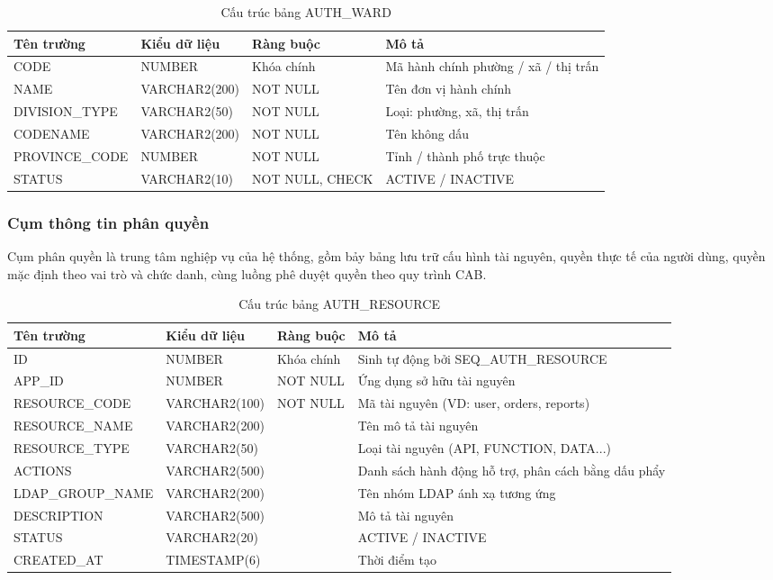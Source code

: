 \documentclass[../DoAn.tex]{subfiles}
\begin{document}
\begin{table}[H]
\centering
\caption{Cấu trúc bảng AUTH\_WARD}
\label{tab:auth-ward}
\footnotesize
\begin{tabular}{|p{3.0cm}|p{2.3cm}|p{2.7cm}|p{4.5cm}|}
\hline
\textbf{Tên trường} & \textbf{Kiểu dữ liệu} & \textbf{Ràng buộc} & \textbf{Mô tả} \\ \hline
CODE & NUMBER & Khóa chính & Mã hành chính phường / xã / thị trấn \\ \hline
NAME & VARCHAR2(200) & NOT NULL & Tên đơn vị hành chính \\ \hline
DIVISION\_TYPE & VARCHAR2(50) & NOT NULL & Loại: phường, xã, thị trấn \\ \hline
CODENAME & VARCHAR2(200) & NOT NULL & Tên không dấu \\ \hline
PROVINCE\_CODE & NUMBER & NOT NULL & Tỉnh / thành phố trực thuộc \\ \hline
STATUS & VARCHAR2(10) & NOT NULL, CHECK & ACTIVE / INACTIVE \\ \hline
\end{tabular}
\end{table}

\subsubsection{Cụm thông tin phân quyền}

Cụm phân quyền là trung tâm nghiệp vụ của hệ thống, gồm bảy bảng lưu trữ cấu hình tài nguyên, quyền thực tế của người dùng, quyền mặc định theo vai trò và chức danh, cùng luồng phê duyệt quyền theo quy trình CAB.

\begin{table}[H]
\centering
\caption{Cấu trúc bảng AUTH\_RESOURCE}
\label{tab:auth-resource}
\footnotesize
\begin{tabular}{|p{3.0cm}|p{2.3cm}|p{2.7cm}|p{4.5cm}|}
\hline
\textbf{Tên trường} & \textbf{Kiểu dữ liệu} & \textbf{Ràng buộc} & \textbf{Mô tả} \\ \hline
ID & NUMBER & Khóa chính & Sinh tự động bởi SEQ\_AUTH\_RESOURCE \\ \hline
APP\_ID & NUMBER & NOT NULL & Ứng dụng sở hữu tài nguyên \\ \hline
RESOURCE\_CODE & VARCHAR2(100) & NOT NULL & Mã tài nguyên (VD: user, orders, reports) \\ \hline
RESOURCE\_NAME & VARCHAR2(200) & & Tên mô tả tài nguyên \\ \hline
RESOURCE\_TYPE & VARCHAR2(50) & & Loại tài nguyên (API, FUNCTION, DATA...) \\ \hline
ACTIONS & VARCHAR2(500) & & Danh sách hành động hỗ trợ, phân cách bằng dấu phẩy \\ \hline
LDAP\_GROUP\_NAME & VARCHAR2(200) & & Tên nhóm LDAP ánh xạ tương ứng \\ \hline
DESCRIPTION & VARCHAR2(500) & & Mô tả tài nguyên \\ \hline
STATUS & VARCHAR2(20) & & ACTIVE / INACTIVE \\ \hline
CREATED\_AT & TIMESTAMP(6) & & Thời điểm tạo \\ \hline
\end{tabular}
\end{table}
\end{document}
